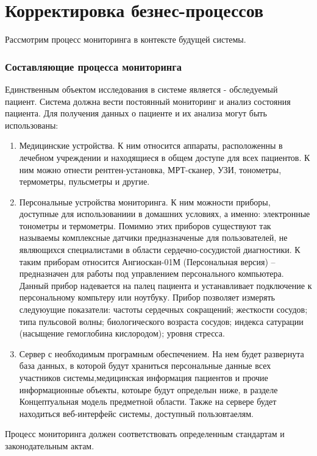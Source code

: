 \newpage
\chapter{Корректировка безнес-процессов}
Рассмотрим процесс мониторинга в контексте будущей системы.

\subsection{Составляющие процесса мониторинга}

Единственным объектом исследования в системе является - обследуемый пациент. Система должна вести постоянный мониторинг и анализ состояния пациента.
Для получения данных о пациенте и их анализа могут быть использованы:

\begin{enumerate}
  \item Медицинские устройства. К ним относится аппараты, расположенны в
  лечебном учреждении и находящиеся в общем доступе для всех пациентов. К ним можно отнести рентген-установка, МРТ-сканер, УЗИ, тонометры, термометры, пульсметры и другие.
  \item Персональные устройства мониторинга. К ним можности приборы, доступные
  для использованиии в домашних условиях, а именно: электронные тонометры и термометры. Помимио этих приборов существуют так называемы комплексные датчики предназначеные для пользователей, не являющихся специалистами в области сердечно-сосудистой диагностики. К таким приборам относится Ангиоскан-01М (Персональная версия) – предназначен для работы под управлением персонального компьютера. Данный прибор надевается на палец пациента и устанавливает подключение к персональному компьтеру или ноутбуку. Прибор позволяет измерять следуюущие показатели: частоты сердечных сокращений; жесткости сосудов; типа пульсовой волны; биологического возраста сосудов; индекса сатурации (насыщение гемоглобина кислородом); уровня стресса.
  \item Сервер с необходимым програмным обеспечением. На нем будет развернута
  база данных, в которой будут храниться персональные данные всех участников системы,медицинская информация пациентов и прочие информационные объекты, котоыре будут определын ниже,  в разделе Концептуальная модель предметной области. Также на сервере будет находиться веб-интерфейс системы, доступный пользовтаелям.
\end{enumerate}

Процесс мониторинга должен соответствовать определенным стандартам и законодательным актам.

